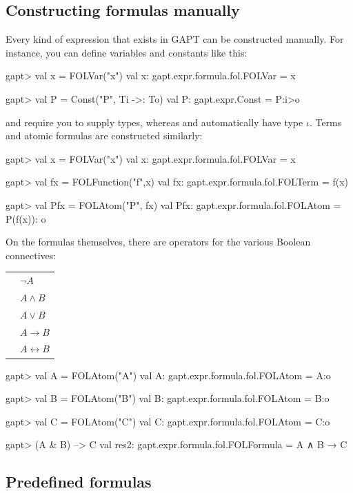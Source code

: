 \documentclass[a4paper,11pt]{book}
\newcommand{\impl}{\to} %
\newcommand{\cli}[1]{{\ttfamily {#1}}}
\begin{document}
\subsection{Constructing formulas manually}
Every kind of expression that exists in GAPT can be constructed manually. For instance, you can define variables
and constants like this:
\begin{clilisting}
gapt> val x = FOLVar("x")
val x: gapt.expr.formula.fol.FOLVar = x

gapt> val P = Const("P", Ti ->: To)
val P: gapt.expr.Const = P:i>o

\end{clilisting}
\cli{Var} and \cli{Const} require you to supply types, whereas \cli{FOLVar} and
\cli{FOLConst} automatically have type $\iota$. Terms and atomic formulas are constructed
similarly:
\begin{clilisting}
gapt> val x = FOLVar("x")
val x: gapt.expr.formula.fol.FOLVar = x

gapt> val fx = FOLFunction("f",x)
val fx: gapt.expr.formula.fol.FOLTerm = f(x)

gapt> val Pfx = FOLAtom("P", fx)
val Pfx: gapt.expr.formula.fol.FOLAtom = P(f(x)): o

\end{clilisting}

On the formulas themselves, there are operators for the various Boolean connectives:

\begin{tabular}{r l}
 \cli{-A} & $\neg A$\\
 \cli{A \& B} & $A \wedge B$\\
 \cli{A | B} & $A \vee B$\\
 \cli{A --> B} & $A \impl B$\\
 \cli{A <-> B} & $A \leftrightarrow B$
\end{tabular}
 
\begin{clilisting}
gapt> val A = FOLAtom("A")
val A: gapt.expr.formula.fol.FOLAtom = A:o

gapt> val B = FOLAtom("B")
val B: gapt.expr.formula.fol.FOLAtom = B:o

gapt> val C = FOLAtom("C")
val C: gapt.expr.formula.fol.FOLAtom = C:o

gapt> (A & B) --> C
val res2: gapt.expr.formula.fol.FOLFormula = A ∧ B → C

\end{clilisting}

\subsection{Predefined formulas}
\end{document}
